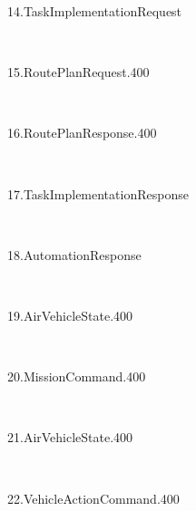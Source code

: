 \begin{fullwidth}
\begin{multicols*}{2}
\begin{description}
	\item[\hypertarget{msg:14.TaskImplementationRequest}{14.TaskImplementationRequest}]  \hfill \ 
	\item[\hypertarget{msg:15.RoutePlanRequest.400}{15.RoutePlanRequest.400}]  \hfill \ 
	\item[\hypertarget{msg:16.RoutePlanResponse.400}{16.RoutePlanResponse.400}]  \hfill \ 
	\item[\hypertarget{msg:17.TaskImplementationResponse}{17.TaskImplementationResponse}]  \hfill \ 
	\item[\hypertarget{msg:18.AutomationResponse}{18.AutomationResponse}]  \hfill \ 
	\item[\hypertarget{msg:19.AirVehicleState.400}{19.AirVehicleState.400}]  \hfill \ 
	\item[\hypertarget{msg:20.MissionCommand.400}{20.MissionCommand.400}]  \hfill \ 
	\item[\hypertarget{msg:21.AirVehicleState.400}{21.AirVehicleState.400}]  \hfill \ 
	\item[\hypertarget{msg:22.VehicleActionCommand.400}{22.VehicleActionCommand.400}]  \hfill \ 
\end{description}
\end{multicols*}
\end{fullwidth}

